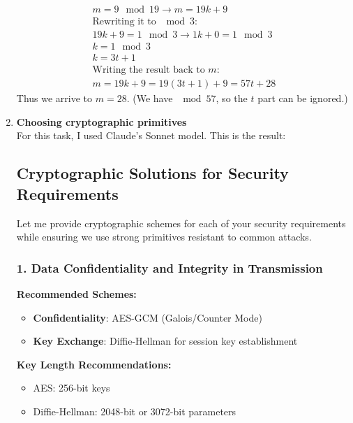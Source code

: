\documentclass{article}
\begin{document}
\begin{enumerate}[label=\textbf{Task \arabic*:}]
\begin{gather*}
			m = 9 \mod 19 \rightarrow m = 19k + 9 \\
			\text{Rewriting it to $\mod 3$:} \\
			19k + 9 = 1 \mod 3 \rightarrow 1k + 0 = 1 \mod 3 \\
			k = 1 \mod 3 \\
			k = 3t + 1 \\
			\text{Writing the result back to $m$:} \\
			m = 19k + 9 = 19(3t + 1) + 9 = 57t + 28
		\end{gather*}
		Thus we arrive to $m = 28$. (We have $\mod 57$, so the $t$ part can be ignored.)
		\item \textbf{Choosing cryptographic primitives}\\
		For this task, I used Claude's Sonnet model.\cite{claude3} This is the result:\\
		\begin{tcolorbox}[ 
			breakable,
			before skip=0pt,           %
			after skip=12pt,            %
			break at=\textheight       %
			]	
		
		\subsection*{Cryptographic Solutions for Security Requirements}
		Let me provide cryptographic schemes for each of your security requirements while ensuring we use strong primitives resistant to common attacks.
		
		\subsubsection*{1. Data Confidentiality and Integrity in Transmission}
		\textbf{Recommended Schemes:}
		\begin{itemize}
			\item \textbf{Confidentiality}: AES-GCM (Galois/Counter Mode)
			\item \textbf{Key Exchange}: Diffie-Hellman for session key establishment
		\end{itemize}
		
		\textbf{Key Length Recommendations:}
		\begin{itemize}
			\item AES: 256-bit keys
			\item Diffie-Hellman: 2048-bit or 3072-bit parameters
		\end{itemize}
		

\end{tcolorbox}
\end{enumerate}
\end{document}
